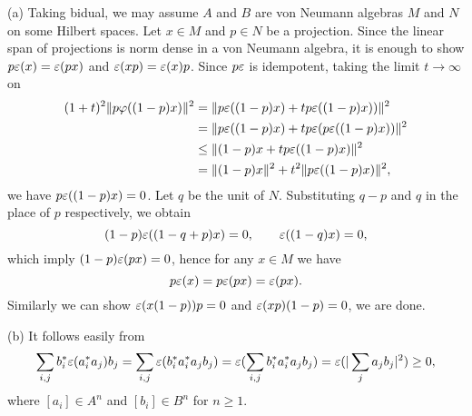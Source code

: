 \documentclass{../../large}
\begin{document}
\begin{pf}
(a)
Taking bidual, we may assume $A$ and $B$ are von Neumann algebras $M$ and $N$ on some Hilbert spaces.
Let $x\in M$ and $p\in N$ be a projection.
Since the linear span of projections is norm dense in a von Neumann algebra, it is enough to show $p\varepsilon(x)=\varepsilon(px)$ and $\varepsilon(xp)=\varepsilon(x)p$.
Since $p\varepsilon$ is idempotent, taking the limit $t\to\infty$ on
\begin{align*}
(1+t)^2\|p\varphi((1-p)x)\|^2
&=\|p\varepsilon((1-p)x)+tp\varepsilon((1-p)x))\|^2\\
&=\|p\varepsilon((1-p)x)+tp\varepsilon(p\varepsilon((1-p)x))\|^2\\
&\le\|(1-p)x+tp\varepsilon((1-p)x)\|^2\\
&=\|(1-p)x\|^2+t^2\|p\varepsilon((1-p)x)\|^2,
\end{align*}
we have $p\varepsilon((1-p)x)=0$.
Let $q$ be the unit of $N$.
Substituting $q-p$ and $q$ in the place of $p$ respectively, we obtain
\[(1-p)\varepsilon((1-q+p)x)=0,\qquad\varepsilon((1-q)x)=0,\]
which imply $(1-p)\varepsilon(px)=0$, hence for any $x\in M$ we have
\[p\varepsilon(x)=p\varepsilon(px)=\varepsilon(px).\]
Similarly we can show $\varepsilon(x(1-p))p=0$ and $\varepsilon(xp)(1-p)=0$, we are done.

(b)
It follows easily from
\[\sum_{i,j}b_i^*\varepsilon(a_i^*a_j)b_j=\sum_{i,j}\varepsilon(b_i^*a_i^*a_jb_j)=\varepsilon(\sum_{i,j}b_i^*a_i^*a_jb_j)=\varepsilon(|\sum_{j}a_jb_j|^2)\ge0,\]
where $[a_i]\in A^n$ and $[b_i]\in B^n$ for $n\ge1$.
\end{pf}
\end{document}
